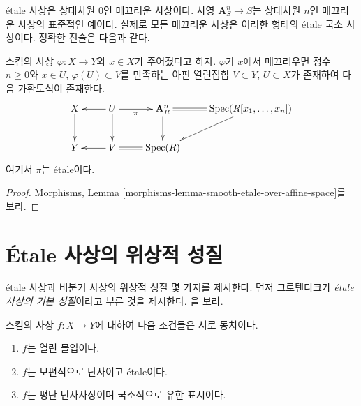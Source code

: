 \noindent
\'etale 사상은 상대차원 0인 매끄러운 사상이다.
사영 $\mathbf{A}^n_S \to S$는 상대차원 $n$인 매끄러운 사상의
표준적인 예이다.
실제로 모든 매끄러운 사상은 이러한 형태의 \'etale 국소 사상이다.
정확한 진술은 다음과 같다.

\begin{theorem}
\label{theorem-smooth-etale-over-n-space}
스킴의 사상 $\varphi : X \to Y$와 $x \in X$가 주어졌다고 하자.
$\varphi$가 $x$에서 매끄러우면 정수 $n \geq 0$와
$x \in U$, $\varphi(U) \subset V$를 만족하는
아핀 열린집합 $V \subset Y$, $U \subset X$가 존재하여
다음 가환도식이 존재한다.
$$
\xymatrix{
X \ar[d] & U \ar[l] \ar[d] \ar[r]_-\pi &
\mathbf{A}^n_R \ar[d] \ar@{=}[r] &  \Spec(R[x_1, \ldots, x_n]) \ar[dl] \\
Y & V \ar[l] \ar@{=}[r] & \Spec(R)
}
$$
여기서 $\pi$는 \'etale이다.
\end{theorem}

\begin{proof}
Morphisms, Lemma \ref{morphisms-lemma-smooth-etale-over-affine-space}를
보라.
\end{proof}





\section{\'Etale 사상의 위상적 성질}
\label{section-topological-etale}

\noindent
\'etale 사상과 비분기 사상의 위상적 성질 몇 가지를 제시한다.
먼저 그로텐디크가 {\it \'etale 사상의 기본 성질}이라고 부른 것을
제시한다. \cite[Expos\'e I.5]{SGA1}을 보라.

\begin{theorem}
\label{theorem-etale-radicial-open}
스킴의 사상 $f : X \to Y$에 대하여 다음 조건들은 서로 동치이다.
\begin{enumerate}
\item $f$는 열린 몰입이다.
\item $f$는 보편적으로 단사이고 \'etale이다.
\item $f$는 평탄 단사사상이며 국소적으로 유한 표시이다.
\end{enumerate}
\end{theorem}

